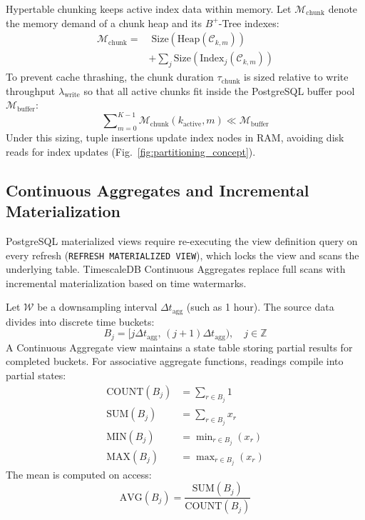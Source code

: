 \documentclass[conference,a4paper]{IEEEtran}
\newcommand{\code}[1]{\texttt{\small #1}}
\begin{document}
Hypertable chunking keeps active index data within memory. Let $\mathcal{M}_{\mathrm{chunk}}$ denote the memory demand of a chunk heap and its $B^+$-Tree indexes:
\begin{equation}
\begin{split}
    \mathcal{M}_{\mathrm{chunk}} = &\; \mathrm{Size}(\mathrm{Heap}(\mathcal{C}_{k, m})) \\
    &+ \sum\nolimits_{j} \mathrm{Size}(\mathrm{Index}_j(\mathcal{C}_{k, m}))
\end{split}
\end{equation}
To prevent cache thrashing, the chunk duration $\tau_{\mathrm{chunk}}$ is sized relative to write throughput $\lambda_{\mathrm{write}}$ so that all active chunks fit inside the PostgreSQL buffer pool $\mathcal{M}_{\mathrm{buffer}}$:
\begin{equation}
    \sum\nolimits_{m=0}^{K-1} \mathcal{M}_{\mathrm{chunk}}(k_{\mathrm{active}}, m) \ll \mathcal{M}_{\mathrm{buffer}}
\end{equation}
Under this sizing, tuple insertions update index nodes in RAM, avoiding disk reads for index updates (Fig.~\ref{fig:partitioning_concept}).

\subsection{Continuous Aggregates and Incremental Materialization}
PostgreSQL materialized views require re-executing the view definition query on every refresh (\code{REFRESH MATERIALIZED VIEW}), which locks the view and scans the underlying table. TimescaleDB Continuous Aggregates replace full scans with incremental materialization based on time watermarks.

Let $\mathcal{W}$ be a downsampling interval $\Delta t_{\mathrm{agg}}$ (such as 1 hour). The source data divides into discrete time buckets:
\begin{equation}
    B_j = [j\Delta t_{\mathrm{agg}},\, (j+1)\Delta t_{\mathrm{agg}}), \quad j \in \mathbb{Z}
\end{equation}
A Continuous Aggregate view maintains a state table storing partial results for completed buckets. For associative aggregate functions, readings compile into partial states:
\begin{align}
    \mathrm{COUNT}(B_j) &= \sum\nolimits_{r \in B_j} 1 \\
    \mathrm{SUM}(B_j) &= \sum\nolimits_{r \in B_j} x_r \\
    \mathrm{MIN}(B_j) &= \min\nolimits_{r \in B_j} (x_r) \\
    \mathrm{MAX}(B_j) &= \max\nolimits_{r \in B_j} (x_r)
\end{align}
The mean is computed on access:
\begin{equation}
    \mathrm{AVG}(B_j) = \frac{\mathrm{SUM}(B_j)}{\mathrm{COUNT}(B_j)}
\end{equation}
\end{document}
